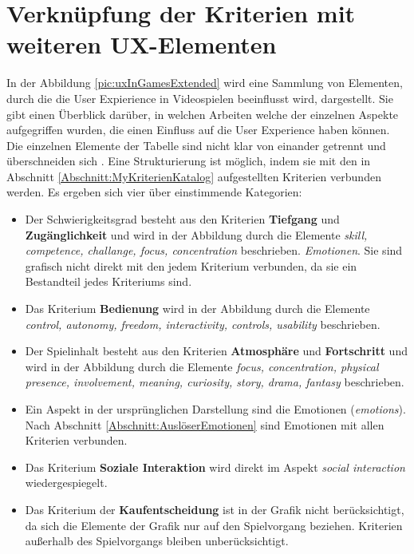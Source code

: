 \section{Verknüpfung der Kriterien mit weiteren UX-Elementen}

In der Abbildung \ref{pic:uxInGamesExtended} wird eine Sammlung von Elementen, durch die die User Expierience in Videospielen beeinflusst wird, dargestellt. Sie gibt einen Überblick darüber, in welchen Arbeiten welche der einzelnen Aspekte aufgegriffen wurden, die einen Einfluss auf die User Experience haben können. Die einzelnen Elemente der Tabelle sind nicht klar von einander getrennt und überschneiden sich \cite[S. 28]{Bernhaupt:2010vi}. Eine Strukturierung ist möglich, indem sie mit den in Abschnitt \ref{Abschnitt:MyKriterienKatalog} aufgestellten Kriterien verbunden werden.  Es ergeben sich vier über einstimmende Kategorien: 

\begin{itemize}
\item Der Schwierigkeitsgrad besteht aus den Kriterien \textbf{Tiefgang} und \textbf{Zugänglichkeit} und wird in der Abbildung durch die Elemente \textit{skill, competence, challange, focus, concentration} beschrieben.
\textit{Emotionen}. Sie sind grafisch nicht direkt mit den jedem Kriterium verbunden, da sie ein Bestandteil jedes Kriteriums sind.
\item Das Kriterium \textbf{Bedienung} wird in der Abbildung durch die Elemente \textit{control, autonomy, freedom, interactivity, controls, usability} beschrieben.
\item Der Spielinhalt besteht aus den Kriterien \textbf{Atmosphäre} und \textbf{Fortschritt} und wird in der Abbildung durch die Elemente \textit{focus, concentration, physical presence, involvement, meaning, curiosity, story, drama, fantasy} beschrieben.
\item Ein Aspekt in der ursprünglichen Darstellung sind die Emotionen (\textit{emotions}). Nach Abschnitt \ref{Abschnitt:AuslöserEmotionen} sind Emotionen mit allen Kriterien verbunden. 
\item Das Kriterium \textbf{Soziale Interaktion} wird direkt im Aspekt \textit{social interaction} wiedergespiegelt.
\item Das Kriterium der \textbf{Kaufentscheidung} ist in der Grafik nicht berücksichtigt, da sich die Elemente der Grafik nur auf den Spielvorgang beziehen. Kriterien außerhalb des Spielvorgangs bleiben unberücksichtigt.
\end{itemize}






